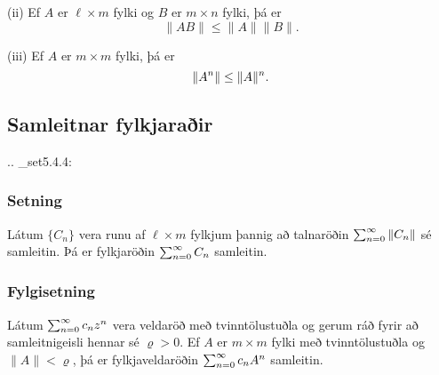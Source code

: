 \noindent 
(ii) Ef $A$ er $\ell\times m$ fylki og $B$ er $m\times n$ fylki, þá
er
 $$\|AB\|\leq \|A\|\|B\|.
 $$

\noindent
(iii) Ef $A$ er $m\times m$ fylki, þá er
 $$\|A\sp n\|\leq \|A\|\sp n.
 $$


\subsection*{Samleitnar fylkjaraðir}


.. _set5.4.4:

\subsubsection{Setning} Látum $\{C_n\}$ vera runu
af $\ell\times m$ fylkjum  þannig að talnaröðin $\sum_{n=0}\sp
\infty\|C_n\|$ sé samleitin.  Þá er fylkjaröðin $\sum_{n=0}\sp \infty
C_n$ samleitin.



\subsubsection{Fylgisetning}  Látum $\sum_{n=0}\sp \infty c_nz\sp n$ vera veldaröð með
tvinntölustuðla  og gerum ráð fyrir að samleitnigeisli hennar sé
${\varrho}>0$.  Ef $A$ er $m\times m$ fylki með tvinntölustuðla og 
$\|A\|<{\varrho}$,
þá er fylkjaveldaröðin $\sum_{n=0}\sp \infty c_nA\sp n$
samleitin.




